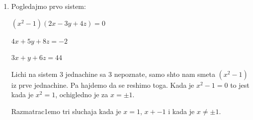 \documentclass[a4paper,12pt]{article}
\begin{document}
\begin{enumerate}[1.]
\item Pogledajmo prvo sistem:
\begin{center}
\par $(x^{2} - 1)(2x -3y + 4z) = 0$
\par $4x + 5y +8z = -2$
\par $3x + y + 6z = 44$
\end{center}

\par Lichi na sistem 3 jednachine sa 3 nepoznate, samo shto nam smeta $(x^{2} - 1)$  iz prve jednachine. Pa hajdemo da se reshimo toga. Kada je $x^{2} - 1 = 0$ to jest kada je $x^{2} =1$, ochigledno je za $x = \pm 1$.
\par Razmatrac1emo tri sluchaja kada je $x = 1$, $x+ -1$ i kada je $x \neq \pm 1$.
\begin{enumerate}[1)]


\end{enumerate}
\end{enumerate}
\end{document}
